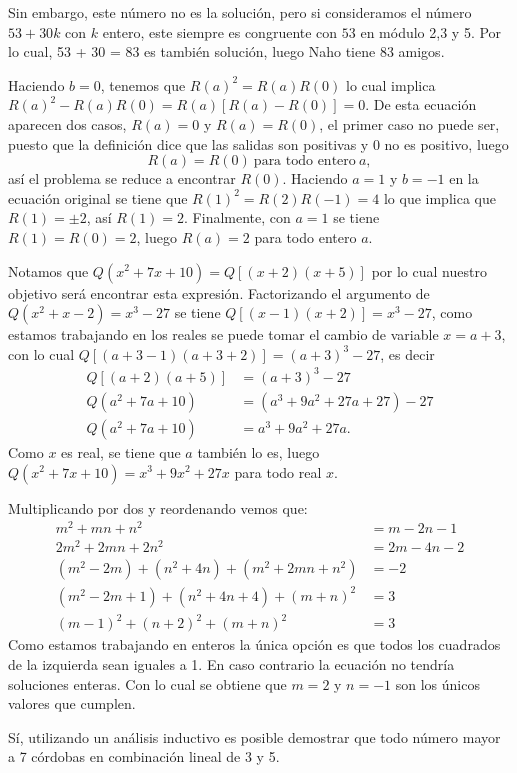 \begin{solution}[(Problema 7)]
    Sin embargo, este número no es la solución, pero si consideramos el número $53 + 30k$ con $k$ entero, este siempre es congruente con $53$ en módulo 2,3 y 5.
    Por lo cual, 53 + 30 = 83 es también solución, luego Naho tiene 83 amigos.
\end{solution}

\begin{solution}[(Problema 8)]
    Haciendo $b = 0$, tenemos que $R(a)^2 = R(a)R(0)$ lo cual implica $R(a)^2 - R(a)R(0) = R(a)\left[R(a) - R(0)\right] = 0$.
    De esta ecuación aparecen dos casos, $R(a) = 0$ y $R(a) = R(0)$, el primer caso no puede ser, puesto que la definición dice que las
    salidas son positivas y 0 no es positivo, luego
    \[
        R(a) = R(0)\ \text{para todo entero}\ a,
    \]
    así el problema se reduce a encontrar $R(0)$.
    Haciendo $a = 1$ y $b = -1$ en la ecuación original se tiene que $R(1)^2 = R(2)R(-1) = 4$ lo que implica que $R(1) = \pm 2$, así $R(1) = 2$.
    Finalmente, con $a = 1$ se tiene $R(1) = R(0) = 2$, luego $R(a) = 2$ para todo entero $a$.
\end{solution}

\begin{solution}[(Problema 9)]
    Notamos que $Q(x^2 + 7x + 10) = Q\left[(x + 2)(x + 5)\right]$ por lo cual nuestro objetivo será encontrar esta expresión.
    Factorizando el argumento de $Q(x^2 + x - 2) = x^3 - 27$ se tiene $Q\left[(x - 1)(x + 2)\right] = x^3 - 27$, como estamos trabajando en los reales
    se puede tomar el cambio de variable $x = a + 3$, con lo cual $Q\left[(a + 3 - 1)(a + 3 + 2)\right] = (a + 3)^3 - 27$, es decir
    \begin{align*}
        Q\left[(a + 2)(a + 5)\right] &= (a + 3)^3 - 27\\
        Q(a^2 + 7a + 10) &= (a^3 + 9a^2 + 27a + 27) - 27\\
        Q(a^2 + 7a + 10) &= a^3 + 9a^2 + 27a.
    \end{align*}
    Como $x$ es real, se tiene que $a$ también lo es, luego $Q(x^2 + 7x + 10) = x^3 + 9x^2 + 27x$ para todo real $x$.
\end{solution}

\begin{solution}[(Problema 10)]
    Multiplicando por dos y reordenando vemos que:
    \begin{align*}
        m^2 + mn + n^2 &= m - 2n - 1\\
        2m^2 + 2mn + 2n^2 &= 2m - 4n - 2\\
        (m^2 - 2m) + (n^2 + 4n) + (m^2 + 2mn + n^2) &= -2\\
        (m^2 - 2m + 1) + (n^2 + 4n + 4) + (m + n)^2 &= 3\\
        (m - 1)^2 + (n + 2)^2 + (m + n)^2 &= 3
    \end{align*}
    Como estamos trabajando en enteros la única opción es que todos los cuadrados de la izquierda sean iguales a 1.
    En caso contrario la ecuación no tendría soluciones enteras.
    Con lo cual se obtiene que $m = 2$ y $n = -1$ son los únicos valores que cumplen.
\end{solution}

\begin{solution}[(Problema 11)]
    Sí, utilizando un análisis inductivo es posible demostrar que todo número mayor a 7 córdobas en combinación lineal de 3 y 5.
\end{solution}